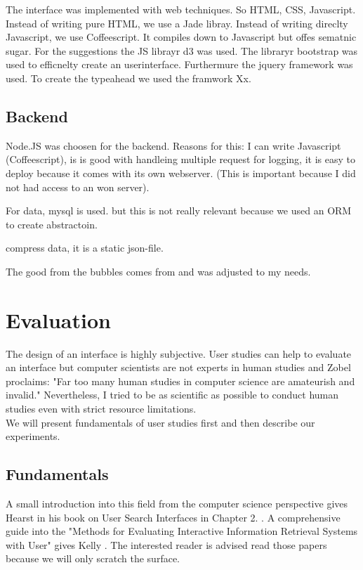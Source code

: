 \documentclass[11pt]{report}
\begin{document}
The interface was implemented with web techniques. So HTML, CSS, Javascript. Instead of writing pure HTML, we use a Jade libray. Instead of writing direclty Javascript, we use Coffeescript. It compiles down to Javascript but offes sematnic sugar. For the suggestions the JS librayr d3 was used. The libraryr bootstrap was used to efficnelty create an userinterface. Furthermure the jquery framework was used. To create the typeahead we used the framwork Xx.

\section{Backend}

Node.JS was choosen for the backend. Reasons for this: I can write Javascript (Coffeescript), is is good with handleing multiple request for logging, it is easy to deploy because it comes with its own webserver. (This is important because I did not had access to an won server). 

For data, mysql is used. but this is not really relevant because we used an ORM to create abstractoin.

compress data, it is a static json-file.

The good from the bubbles comes from and was adjusted to my needs.

\chapter{Evaluation}

The design of an interface is highly subjective. User studies can help to evaluate an interface but computer scientists are not experts in human studies and Zobel \cite{Zobel2004} proclaims: "Far too many human studies in computer science are amateurish and invalid." Nevertheless, I tried to be as scientific as possible to conduct human studies even with strict resource limitations. \\

We will present fundamentals of user studies first and then describe our experiments.

\section{Fundamentals}

A small introduction into this field from the computer science perspective gives Hearst in his book on User Search Interfaces in Chapter 2. \cite{Hearst2009}. A comprehensive guide into the "Methods for Evaluating Interactive Information Retrieval Systems with User" gives Kelly \cite{Kelly2007} . The interested reader is advised read those papers because we will only scratch the surface. \\ 
\end{document}
